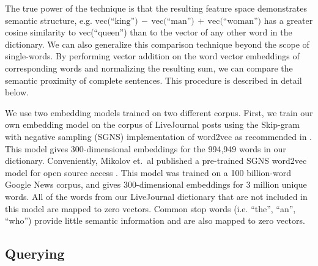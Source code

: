 \documentclass{sigchi}
\begin{document}
The true power of the technique is that the resulting feature space demonstrates semantic structure, e.g. $\text{vec(``king'')}\,{-}\, \text{vec(``man'')}\,{+}\,\text{vec(``woman'')}$ has a greater cosine similarity to vec(``queen'') than to the vector of any other word in the dictionary. We can also generalize this comparison technique beyond the scope of single-words. By performing vector addition on the word vector embeddings of corresponding words and normalizing the resulting sum, we can compare the semantic proximity of complete sentences. This procedure is described in detail below.

We use two embedding models trained on two different corpus. First, we train our own embedding model on the corpus of LiveJournal posts using the Skip-gram with negative sampling (SGNS) implementation of word2vec as recommended in \cite{MikolovSCCD13}. This model gives 300-dimensional embeddings for the 994,949 words in our dictionary. Conveniently, Mikolov et.~al published a pre-trained SGNS word2vec model for open source access \cite{word2vecWEB}. This model was trained on a 100 billion-word Google News corpus, and gives 300-dimensional embeddings for 3 million unique words. All of the words from our LiveJournal dictionary that are not included in this model are mapped to zero vectors. Common stop words (i.e. ``the'', ``an'', ``who'') provide little semantic information and are also mapped to zero vectors.



\subsection{Querying}
\end{document}
